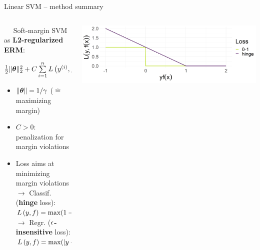 \begin{vbframe}{Linear SVM -- method summary}
\begin{columns}[T, totalwidth = \textwidth]
\begin{column}{0.61\textwidth}
 ~~ Soft-margin SVM as \textbf{L2-regularized ERM}: 
     \centerline{$\frac{1}{2} \|\bm{\theta}\|_2^2 + C \sum\limits_{i=1}^n L\left(y^{(i)}, f\left(\mathbf{x}^{(i)}\right)\right)$}
     \vspace{-\topsep}
  \begin{itemize}
  \setlength{\parskip}{0pt} 
  \setlength{\itemsep}{0pt plus 1pt}
    \item $\|\bm{\theta}\| = 1 / \gamma$ ($\hat{=}$ maximizing margin) \\
    \item $C > 0$: penalization for margin violations
    \item Loss aims at minimizing margin violations\\
    $\rightarrow$ Classif. (\textbf{hinge} loss): $L\left(y, f\right) = \max(1-yf, 0)$ \\
    $\rightarrow$ Regr. (\textbf{$\epsilon$-insensitive} loss):   $L\left(y, f\right) = \max(|y-f| - \epsilon, 0)$ 
  \end{itemize}
\vspace{-\topsep}
\end{column}
\begin{column}{0.38\textwidth}
  \centering
  \includegraphics[height=\textwidth, keepaspectratio=true]{
  figure/plot_loss_hinge.png}

\end{column}
\end{columns}
\end{vbframe}
